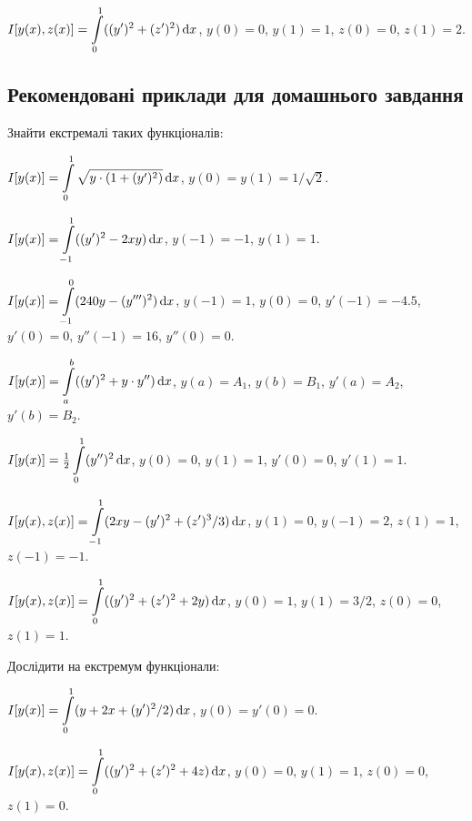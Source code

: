 \begin{problem}
	$I[y(x), z(x)] = \displaystyle\int\limits_0^1 ((y')^2 + (z')^2) \mathop{}\!\mathrm{d} x$, $y(0) = 0$, $y(1) = 1$, $z(0) = 0$, $z(1) = 2$.
\end{problem}

\subsection*{Рекомендовані приклади для домашнього завдання}

Знайти екстремалі таких функціоналів:

\begin{problem}
	$I[y(x)] = \displaystyle\int\limits_0^1 \sqrt{y \cdot (1 + (y')^2)} \mathop{}\!\mathrm{d} x$, $y(0) = y(1) = 1 / \sqrt{2}$.
\end{problem}

\begin{problem}
	$I[y(x)] = \displaystyle\int\limits_{-1}^1 ((y')^2 - 2 x y) \mathop{}\!\mathrm{d} x$, $y(-1) = -1$, $y(1) = 1$.
\end{problem}

\begin{problem}
	$I[y(x)] = \displaystyle\int\limits_{-1}^0 (240 y - (y''')^2) \mathop{}\!\mathrm{d} x$, $y(-1) = 1$, $y(0) = 0$, $y'(-1) = -4.5$, $y'(0) = 0$, $y''(-1) = 16$, $y''(0) = 0$.
\end{problem}

\begin{problem}
	$I[y(x)] = \displaystyle\int\limits_a^b ((y')^2 + y \cdot y'') \mathop{}\!\mathrm{d} x$, $y(a) = A_1$, $y(b) = B_1$, $y'(a) = A_2$, $y'(b) = B_2$.
\end{problem}

\begin{problem}
	$I[y(x)] = \frac{1}{2} \displaystyle\int\limits_0^1 (y'')^2 \mathop{}\!\mathrm{d} x$, $y(0) = 0$, $y(1) = 1$, $y'(0) = 0$, $y'(1) = 1$.
\end{problem}

\begin{problem}
	$I[y(x), z(x)] = \displaystyle\int\limits_{-1}^1 ( 2 x y - (y')^2 + (z')^3 / 3 ) \mathop{}\!\mathrm{d} x$, $y(1) = 0$, $y(-1) = 2$, $z(1) = 1$, $z(-1) = -1$.
\end{problem}

\begin{problem}
	$I[y(x), z(x)] = \displaystyle\int\limits_0^1 ((y')^2 + (z')^2 + 2 y) \mathop{}\!\mathrm{d} x$, $y(0) = 1$, $y(1) = 3 / 2$, $z(0) = 0$, $z(1) = 1$.
\end{problem}

Дослідити на екстремум функціонали:

\begin{problem}
	$I[y(x)] = \displaystyle\int\limits_0^1 (y + 2 x + (y')^2 / 2) \mathop{}\!\mathrm{d} x$, $y(0) = y'(0) = 0$.
\end{problem}

\begin{problem}
	$I[y(x), z(x)] = \displaystyle\int\limits_0^1 ((y')^2 + (z')^2 + 4 z) \mathop{}\!\mathrm{d} x$, $y(0) = 0$, $y(1) = 1$, $z(0) = 0$, $z(1) = 0$.
\end{problem}
